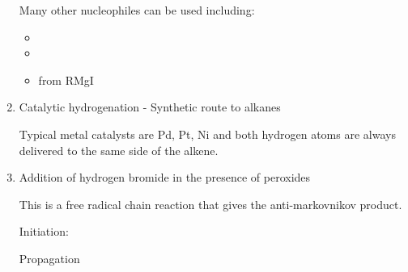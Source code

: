 \begin{enumerate}[label=\alph*)]
    Many other nucleophiles can be used including:

    \begin{itemize}
      \item {}
      \item {}
      \item {} from RMgI
    \end{itemize}

  \item Catalytic hydrogenation - Synthetic route to alkanes


    Typical metal catalysts are Pd, Pt, Ni and both hydrogen atoms are always
    delivered to the same side of the alkene.

  \item Addition of hydrogen bromide in the presence of peroxides

    This is a free radical chain reaction that gives the anti-markovnikov product.


    Initiation:


    Propagation


\end{enumerate}
